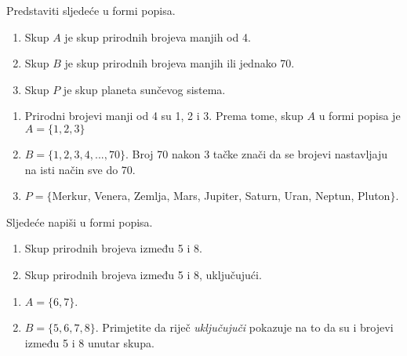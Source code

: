 \documentclass[a4paper, 14pt]{article}
\begin{document}
\begin{tcolorbox}[title=\large PRIMJER \hfill\small\textbf{"Skup u formi popisa"}]
Predstaviti sljedeće u formi popisa.\begin{enumerate}[label=\alph*),leftmargin=4\parindent]
\item Skup $A$ je skup prirodnih brojeva manjih od 4.
\item Skup $B$ je skup prirodnih brojeva manjih ili jednako 70.
\item Skup $P$ je skup planeta sunčevog sistema.
\end{enumerate}
\begin{tcolorbox}
\begin{center}
\begin{enumerate}[label=\alph*),leftmargin=4\parindent]
\item Prirodni brojevi manji od 4 su 1, 2 i 3. Prema tome, skup $A$ u formi popisa je $A=\{1,2,3\}$
\item $B=\{1, 2, 3, 4, ... , 70\}$. Broj 70 nakon 3 tačke znači da se brojevi nastavljaju na isti način sve do 70.
\item $P=\{$Merkur, Venera, Zemlja, Mars, Jupiter, Saturn, Uran, Neptun, Pluton$\}$.
\end{enumerate}
\end{center}
\end{tcolorbox}
\end{tcolorbox}

\begin{tcolorbox}[title=\large PRIMJER \hfill\small\textbf{"Riječ \textit{uključujući}"}]
Sljedeće napiši u formi popisa.
\begin{enumerate}[label=\alph*),leftmargin=4\parindent]
\item Skup prirodnih brojeva između 5 i 8.
\item Skup prirodnih brojeva između 5 i 8, uključujući.
\end{enumerate}
\begin{tcolorbox}
\begin{center}
\begin{enumerate}[label=\alph*),leftmargin=4\parindent]
\item $A=\{6, 7\}$.
\item $B=\{5, 6, 7, 8\}$. Primjetite da riječ \textit{uključujuči} pokazuje na to da su i brojevi između 5 i 8 unutar skupa.
\end{enumerate}
\end{center}
\end{tcolorbox}
\end{tcolorbox}
\end{document}
